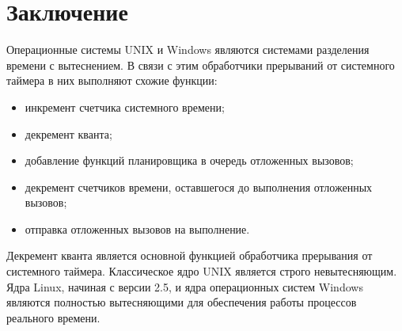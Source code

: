 \documentclass[a4paper,oneside,14pt]{extreport}
\begin{document}
	\chapter*{Заключение}
	Операционные системы UNIX и Windows являются системами разделения времени с вытеснением. В связи с этим обработчики прерываний от системного таймера в них выполняют схожие функции:
	\begin{itemize}
		\item инкремент счетчика системного времени;
		\item декремент кванта;
		\item добавление функций планировщика в очередь отложенных вызовов;
		\item декремент счетчиков времени, оставшегося до выполнения отложенных вызовов;
		\item отправка отложенных вызовов на выполнение.
	\end{itemize}
	Декремент кванта является основной функцией обработчика прерывания от системного таймера.
	Классическое ядро UNIX является строго невытесняющим. Ядра Linux, начиная с версии 2.5, и ядра операционных систем Windows являются полностью вытесняющими для обеспечения работы процессов реального времени.
\end{document}
